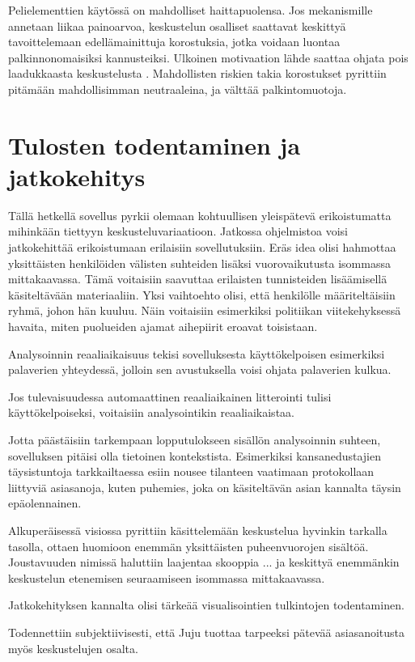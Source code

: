 \documentclass[11pt,a4paper,oneside]{memoir}
\begin{document}
Pelielementtien käytössä on mahdolliset haittapuolensa. Jos mekanismille annetaan liikaa painoarvoa, keskustelun osalliset saattavat keskittyä tavoittelemaan edellämainittuja korostuksia, jotka voidaan luontaa palkinnonomaisiksi kannusteiksi. Ulkoinen motivaation lähde saattaa ohjata pois laadukkaasta keskustelusta \cite{jiang:dangers-of-gamification}. Mahdollisten riskien takia korostukset pyrittiin pitämään mahdollisimman neutraaleina, ja välttää palkintomuotoja.

\chapter{Tulosten todentaminen ja jatkokehitys}
Tällä hetkellä sovellus pyrkii olemaan kohtuullisen yleispätevä erikoistumatta mihinkään tiettyyn keskusteluvariaatioon. Jatkossa ohjelmistoa voisi jatkokehittää erikoistumaan erilaisiin sovellutuksiin. Eräs idea olisi hahmottaa yksittäisten henkilöiden välisten suhteiden lisäksi vuorovaikutusta isommassa mittakaavassa. Tämä voitaisiin saavuttaa erilaisten tunnisteiden lisäämisellä käsiteltävään materiaaliin. Yksi vaihtoehto olisi, että henkilölle määriteltäisiin ryhmä, johon hän kuuluu. Näin voitaisiin esimerkiksi politiikan viitekehyksessä havaita, miten puolueiden ajamat aihepiirit eroavat toisistaan.

Analysoinnin reaaliaikaisuus tekisi sovelluksesta käyttökelpoisen esimerkiksi palaverien yhteydessä, jolloin sen avustuksella voisi ohjata palaverien kulkua. 

Jos tulevaisuudessa automaattinen reaaliaikainen litterointi tulisi käyttökelpoiseksi, voitaisiin analysointikin reaaliaikaistaa. 

Jotta päästäisiin tarkempaan lopputulokseen sisällön analysoinnin suhteen, sovelluksen pitäisi olla tietoinen kontekstista. Esimerkiksi kansanedustajien täysistuntoja tarkkailtaessa esiin nousee tilanteen vaatimaan protokollaan liittyviä asiasanoja, kuten puhemies, joka on käsiteltävän asian kannalta täysin epäolennainen. 

Alkuperäisessä visiossa pyrittiin käsittelemään keskustelua hyvinkin tarkalla tasolla, ottaen huomioon enemmän yksittäisten puheenvuorojen sisältöä. Joustavuuden nimissä haluttiin laajentaa skooppia ... ja keskittyä enemmänkin keskustelun etenemisen seuraamiseen isommassa mittakaavassa.

Jatkokehityksen kannalta olisi tärkeää visualisointien tulkintojen todentaminen.

Todennettiin subjektiivisesti, että Juju tuottaa tarpeeksi pätevää asiasanoitusta myös keskustelujen osalta.



\singlespacing
\begin{flushleft}
  
\end{flushleft}
\end{document}

